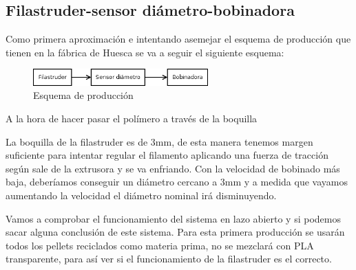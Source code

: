 \subsection{Filastruder-sensor diámetro-bobinadora}
\label{sec:FSB}

Como primera aproximación e intentando asemejar el esquema de producción que tienen en la fábrica de Huesca se va a seguir el siguiente esquema:

	\begin{figure}[H]
            \centering
            \includegraphics[width=0.6\textwidth]{images/producciones/Diagram1.png}
            \caption{Esquema de producción}
            \label{fig:esquemap_FSB}
    \end{figure}

A la hora de hacer pasar el polímero a través de la boquilla




La boquilla de la filastruder es de 3mm, de esta manera tenemos margen suficiente para intentar regular el filamento aplicando una fuerza de tracción según sale de la extrusora y se va enfriando. Con la velocidad de bobinado más baja, deberíamos conseguir un diámetro cercano a 3mm y a medida que vayamos aumentando la velocidad el diámetro nominal irá disminuyendo. \cite{tecno_polimeros}

Vamos a comprobar el funcionamiento del sistema en lazo abierto y si podemos sacar alguna conclusión de este sistema. Para esta primera producción se usarán todos los pellets reciclados como materia prima, no se mezclará con PLA transparente, para así ver si el funcionamiento de la filastruder es el correcto.

